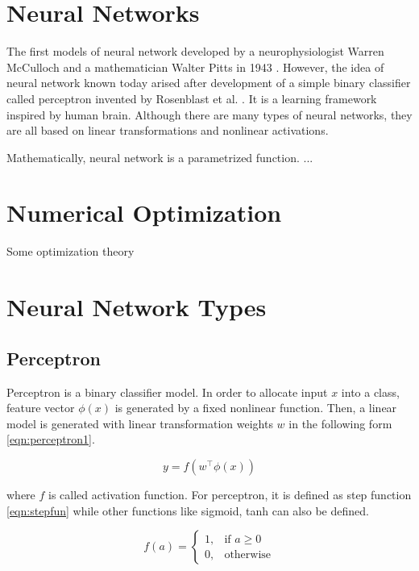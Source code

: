 \section{Neural Networks}
\label{sec:nnet}
The first models of neural network developed by a neurophysiologist Warren McCulloch and a mathematician Walter Pitts in 1943 \cite{mcculloch_logical_1943}. However, the idea of neural network known today arised after development of a simple binary classifier called perceptron invented by Rosenblast et al. \cite{rosenblatt_perceptron_1958}. It is a learning framework inspired by human brain. Although there are many types of neural networks, they are all based on linear transformations and nonlinear activations.

Mathematically, neural network is a parametrized function. ...

\section{Numerical Optimization}
Some optimization theory\\

\section{Neural Network Types}
\label{sec:nnet_types}

\subsection{Perceptron}
Perceptron is a binary classifier model. In order to allocate input $x$ into a class, feature vector $\phi(x)$ is generated by a fixed nonlinear function. Then, a linear model is generated with linear transformation weights $w$ in the following form \ref{eqn:perceptron1}.

\begin{equation}
\label{eqn:perceptron1}
y = f(w^\intercal \phi(x))
\end{equation}

where $f$ is called activation function. For perceptron, it is defined as step function \ref{eqn:stepfun} while other functions like sigmoid, tanh can also be defined.

\begin{equation}
\label{eqn:stepfun}
f(a) = 
\begin{cases}
1,   & \text{if } a\geq 0\\
0,   & \text{otherwise}
\end{cases} 
\end{equation}

